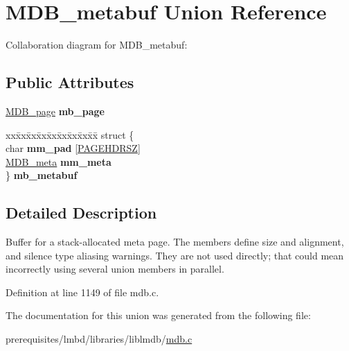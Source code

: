 \hypertarget{union_m_d_b__metabuf}{}\section{M\+D\+B\+\_\+metabuf Union Reference}
\label{union_m_d_b__metabuf}


Collaboration diagram for M\+D\+B\+\_\+metabuf\+:
\subsection*{Public Attributes}
\begin{DoxyCompactItemize}
\item 
\mbox{\label{union_m_d_b__metabuf_adf60c908715689ce6f32c0c136f74e24}} 
\mbox{\hyperlink{struct_m_d_b__page}{M\+D\+B\+\_\+page}} {\bfseries mb\+\_\+page}
\item 
\mbox{\label{union_m_d_b__metabuf_a0af57d23cb50dee1b6d697260fd96a3f}} 
\begin{tabbing}
xx\=xx\=xx\=xx\=xx\=xx\=xx\=xx\=xx\=\kill
struct \{\\
\>char {\bfseries mm\_pad} \mbox{[}\mbox{\hyperlink{group__internal_gae25bcf0c0c5c5ead27e82543cbce02e1}{PAGEHDRSZ}}\mbox{]}\\
\>\mbox{\hyperlink{struct_m_d_b__meta}{MDB\_meta}} {\bfseries mm\_meta}\\
\} {\bfseries mb\_metabuf}\\

\end{tabbing}\end{DoxyCompactItemize}


\subsection{Detailed Description}
Buffer for a stack-\/allocated meta page. The members define size and alignment, and silence type aliasing warnings. They are not used directly; that could mean incorrectly using several union members in parallel. 

Definition at line 1149 of file mdb.\+c.



The documentation for this union was generated from the following file\+:\begin{DoxyCompactItemize}
\item 
prerequisites/lmbd/libraries/liblmdb/\mbox{\hyperlink{mdb_8c}{mdb.\+c}}\end{DoxyCompactItemize}
